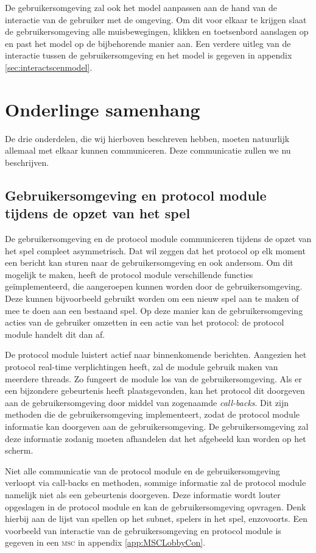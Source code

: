 \documentclass[a4paper,11pt]{article}
\begin{document}
	De gebruikersomgeving zal ook het model aanpassen aan de hand van de interactie van de gebruiker met de omgeving. Om dit voor elkaar te krijgen slaat de gebruikersomgeving alle muisbewegingen, klikken en toetsenbord aanslagen op en past het model op de bijbehorende manier aan. Een verdere uitleg van de interactie tussen de gebruikersomgeving en het model is gegeven in appendix \ref{sec:interactscenmodel}.

    \section{Onderlinge samenhang}
    De drie onderdelen, die wij hierboven beschreven hebben, moeten natuurlijk allemaal met elkaar kunnen communiceren. Deze communicatie zullen we nu beschrijven.

    \subsection{Gebruikersomgeving en protocol module tijdens de opzet van het spel}
    De gebruikersomgeving en de protocol module communiceren tijdens de opzet van het spel compleet asymmetrisch. Dat wil zeggen dat het protocol op elk moment een bericht kan sturen naar de gebruikersomgeving en ook andersom. Om dit mogelijk te maken, heeft de protocol module verschillende functies ge\"implementeerd, die aangeroepen kunnen worden door de gebruikersomgeving. Deze kunnen bijvoorbeeld gebruikt worden om een nieuw spel aan te maken of mee te doen aan een bestaand spel. Op deze manier kan de gebruikersomgeving acties van de gebruiker omzetten in een actie van het protocol: de protocol module handelt dit dan af.

    De protocol module luistert actief naar binnenkomende berichten. Aangezien het protocol real-time verplichtingen heeft, zal de module gebruik maken van meerdere threads. Zo fungeert de module los van de gebruikersomgeving. Als er een bijzondere gebeurtenis heeft plaatsgevonden, kan het protocol dit doorgeven aan de gebruikersomgeving door middel van zogenaamde \emph{call-backs}. Dit zijn methoden die de gebruikersomgeving implementeert, zodat de protocol module informatie kan doorgeven aan de gebruikersomgeving. De gebruikersomgeving zal deze informatie zodanig moeten afhandelen dat het afgebeeld kan worden op het scherm.

    Niet alle communicatie van de protocol module en de gebruikersomgeving verloopt via call-backs en methoden, sommige informatie zal de protocol module namelijk niet als een gebeurtenis doorgeven. Deze informatie wordt louter opgeslagen in de protocol module en kan de gebruikersomgeving opvragen. Denk hierbij aan de lijst van spellen op het subnet, spelers in het spel, enzovoorts. Een voorbeeld van interactie van de gebruikersomgeving en protocol module is gegeven in een \textsc{msc} in appendix \ref{app:MSCLobbyCon}.
\end{document}
